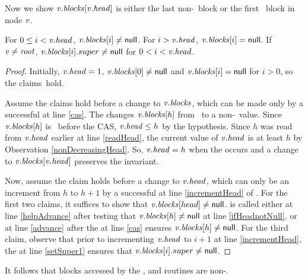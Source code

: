 Now we show $\var{v}.\fld{blocks}[\var{v}.\head]$ is either the last non-\nl\ block or the first \nl\ block in node $\var{v}$.

\begin{invariant}\label{inv::headPosition} 
For $0 \leq i < \var{v}.\head$, $\var{v}.\fld{blocks}[i]\neq\nl$.  For $i>\var{v}.\head$, $\var{v}.\fld{blocks}[i]=\nl$.
If $\var{v}\neq \var{root}$,  $\var{v}.\fld{blocks}[i].super \neq \nl$ for $0<i<\var{v}.\head$.
\end{invariant}

\begin{proof}
Initially, $\var{v}.\head=1$, $\var{v}.\fld{blocks}[0]\neq\nl$  and $\var{v}.\fld{blocks}[i]=\nl$ for  $i>0$, so the claims~hold.

Assume the claims hold before a change to $\var{v}.\fld{blocks}$, which can be made only
by a successful  at line \ref{cas}.
The  changes $\var{v}.\fld{blocks}[h]$ from \nl\ to a non-\nl\ value.
Since $\var{v}.\fld{blocks}[h]$ is \nl\ before the CAS, $\var{v}.\head \leq h$ by the hypothesis.
Since $h$ was read from $\var{v}.\head$ earlier at line \ref{readHead}, the current value of 
$\var{v}.\head$ is at least $h$ by Observation \ref{nonDecreasingHead}.
So, $\var{v}.\head=h$ when the  occurs and a change to $\var{v}.\fld{blocks}[\var{v}.\head]$ preserves the invariant.

Now, assume the claim holds before a change to $\var{v}.\head$, which can only be an increment from $h$ to $h+1$
by a successful  at line \ref{incrementHead} of .
For the first two claims, it suffices to show that $\var{v}.\fld{blocks}[head] \neq \nl$.
 is called either at line \ref{helpAdvance} 
after testing that $\var{v}.\fld{blocks}[h]\neq\nl$ at line \ref{ifHeadnotNull},
or at line \ref{advance} after the  at line \ref{cas} ensures $\var{v}.\fld{blocks}[h]\neq\nl$.
For the third claim, observe that prior to incrementing $\var{v}.\head$ to $i+1$ at line \ref{incrementHead},
the  at line \ref{setSuper1} ensures that $\var{v}.\fld{blocks}[i].super\neq \nl$.
\end{proof}

It follows that blocks accessed by the ,  and  routines are non-\nl.

